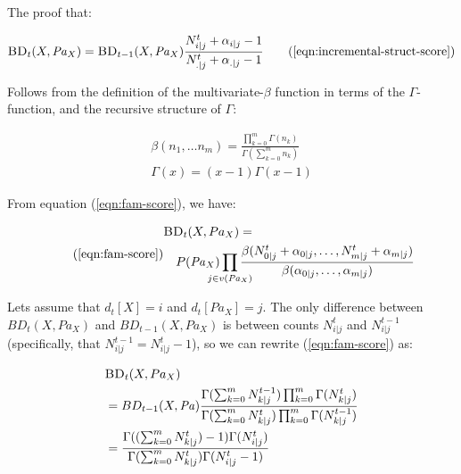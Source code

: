 \documentclass{article}
\newcommand{\Pa}{\mathit{Pa}}
\begin{document}
	The proof that:
	
	\begin{equation}
	\textsc{BD}_{t}(X, \Pa_X) = \textsc{BD}_{t-1}(X, \Pa_X) \frac{N^{t}_{i|j} + \alpha_{i | j} - 1}{N^{t}_{.|j} + \alpha_{.|j} - 1}
	\tag{\ref{eqn:incremental-struct-score}}
	\end{equation}
	
	Follows from the definition of the multivariate-$\beta$ function in terms of the $\Gamma$-function, and the recursive structure of $\Gamma$:
	
	\begin{gather}
	\beta(n_1, \dots n_m) = \frac{\prod_{k = 0}^{m} \Gamma(n_k)}{\Gamma(\sum_{k = 0}^{m} n_k)} \\
	\label{eqn:gamma-recurse}
	\Gamma(x) = (x - 1) \Gamma(x - 1)
	\end{gather}
	
	From equation (\ref{eqn:fam-score}), we have:
	
	\begin{equation}
	\tag{\ref{eqn:fam-score}}
	\begin{aligned}
	&\textsc{BD}_t(X, Pa_X) =\\
	&\quad P(\Pa_X) \prod_{\mathclap{j \in v(\Pa_X)}} \frac{\beta(N^t_{0|j} + \alpha_{0|j}, \dots , N^t_{m | j} + \alpha_{m | j})}{\beta(\alpha_{0 | j}, \dots, \alpha_{m|j})}
	\end{aligned}
	\end{equation}
	
	Lets assume that $d_t[X] = i$ and $d_t[\Pa_X] = j$. The only difference between $BD_t(X, Pa_X)$ and $BD_{t-1}(X, Pa_X)$ is between counts $N^t_{i | j}$ and $N^{t-1}_{i | j}$ (specifically, that $N^{t-1}_{i | j}  = N^{t}_{i | j} - 1$), so we can rewrite (\ref{eqn:fam-score}) as:
	
	\begin{align*}
		&\textsc{BD}_t(X, Pa_X)\\
		&= BD_{t-1}(X, \Pa) 
		\frac
			{\Gamma(\sum_{k=0}^m N^{t-1}_{k|j}) \prod_{k=0}^m\Gamma(N^t_{k|j})}
			{\Gamma(\sum_{k=0}^m N^{t}_{k|j}) \prod_{k=0}^m \Gamma(N^{t-1}_{k | j})} \\
		&= \frac
		{\Gamma((\sum_{k=0}^m N^{t}_{k|j}) - 1) \Gamma(N^t_{i|j})}
		{\Gamma(\sum_{k=0}^m N^{t}_{k|j}) \Gamma(N^{t}_{i | j} - 1)} \\
	\end{align*}
	
\end{document}
